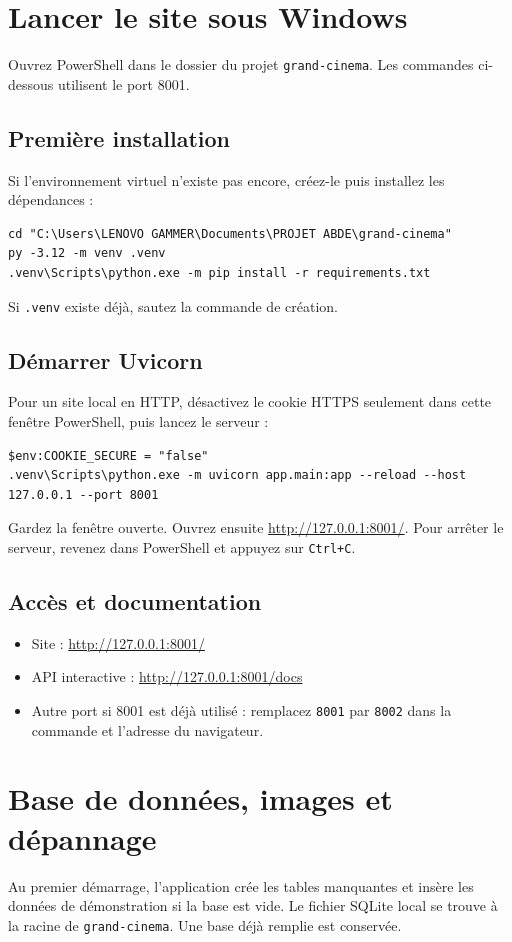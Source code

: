 \documentclass[11pt,a4paper]{article}
\begin{document}
\newpage
\section{Lancer le site sous Windows}
Ouvrez PowerShell dans le dossier du projet \texttt{grand-cinema}. Les commandes ci-dessous utilisent le port 8001.

\subsection{Première installation}
Si l'environnement virtuel n'existe pas encore, créez-le puis installez les dépendances :
\begin{lstlisting}[style=powershell]
cd "C:\Users\LENOVO GAMMER\Documents\PROJET ABDE\grand-cinema"
py -3.12 -m venv .venv
.venv\Scripts\python.exe -m pip install -r requirements.txt
\end{lstlisting}
Si \texttt{.venv} existe déjà, sautez la commande de création.

\subsection{Démarrer Uvicorn}
Pour un site local en HTTP, désactivez le cookie HTTPS seulement dans cette fenêtre PowerShell, puis lancez le serveur :
\begin{lstlisting}[style=powershell]
$env:COOKIE_SECURE = "false"
.venv\Scripts\python.exe -m uvicorn app.main:app --reload --host 127.0.0.1 --port 8001
\end{lstlisting}
Gardez la fenêtre ouverte. Ouvrez ensuite \url{http://127.0.0.1:8001/}. Pour arrêter le serveur, revenez dans PowerShell et appuyez sur \texttt{Ctrl+C}.

\subsection{Accès et documentation}
\begin{itemize}
  \item Site : \url{http://127.0.0.1:8001/}
  \item API interactive : \url{http://127.0.0.1:8001/docs}
  \item Autre port si 8001 est déjà utilisé : remplacez \texttt{8001} par \texttt{8002} dans la commande et l'adresse du navigateur.
\end{itemize}

\newpage
\section{Base de données, images et dépannage}
Au premier démarrage, l'application crée les tables manquantes et insère les données de démonstration si la base est vide. Le fichier SQLite local se trouve à la racine de \texttt{grand-cinema}. Une base déjà remplie est conservée.
\end{document}
